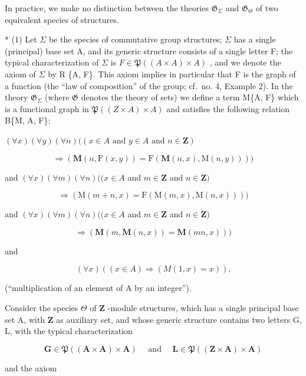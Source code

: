 In practice, we make no distinction between the theories \(\mathfrak{G}_{\Sigma}\) and \(\mathfrak{G}_{\Theta}\) of two equivalent species of structures.


* (1) Let \(\Sigma\) be the species of commutative group structures; \(\Sigma\) has a single (principal) base set A, and its generic structure consists of a single letter F; the typical characterization of \(\Sigma\) is \(F \in \mathfrak{P}((A \times A) \times A)\) , and we denote the axiom of \(\Sigma\) by R \{A, F\}. This axiom implies in particular that F is the graph of a function (the ``law of composition'' of the group; cf.~no. 4, Example 2). In the theory \(\mathfrak{G}_{\Sigma}\) (where \(\mathfrak{G}\) denotes the theory of sets) we define a term M\{A, F\} which is a functional graph in \(\mathfrak{P}((Z \times A) \times A)\) and satisfies the following relation B\{M, A, F\}:

\((\forall x)(\forall y)(\forall n)((x \in A \text{ and } y \in A \text{ and } n \in \mathbf{Z})\)

\[
\Longrightarrow (\mathbf {M} (n, \mathrm{F} (x, y)) = \mathrm{F} (\mathbf {M} (n, x), \mathrm{M} (n, y))))
\]

and \((\forall x)(\forall m)(\forall n)((x\in A\) and \(m\in \mathbf{Z}\) and \(n\in \mathbf{Z})\)

\[
\Rightarrow (\mathrm{M} (m + n, x) = \mathrm{F} (\mathrm{M} (m, x), \mathrm{M} (n, x))))
\]

and \((\forall x)(\forall m)(\forall n)((x\in A\) and \(m\in \mathbf{Z}\) and \(n\in \mathbf{Z})\)

\[
\Longrightarrow (\mathbf {M} (m, \mathbf {M} (n, x)) = \mathbf {M} (m n, x)))
\]

and

\[
(\forall x) ((x \in A) \Longrightarrow (M (1, x) = x)).
\]

(``multiplication of an element of A by an integer'').

Consider the species \(\Theta\) of \(\mathbf{Z}\) -module structures, which has a single principal base set A, with \(\mathbf{Z}\) as auxiliary set, and whose generic structure contains two letters G, L, with the typical characterization

\[
\mathbf {G} \in \mathfrak {P} ((\mathbf {A} \times \mathbf {A}) \times \mathbf {A}) \quad \text { and } \quad \mathbf {L} \in \mathfrak {P} ((\mathbf {Z} \times \mathbf {A}) \times \mathbf {A})
\]

and the axiom

